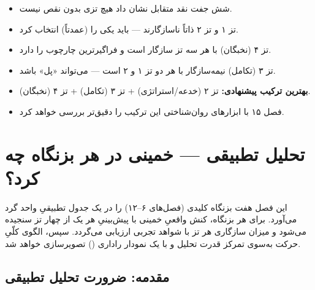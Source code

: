 \documentclass[12pt,a4paper]{book}
\newcommand{\keyword}[1]{\textbf{\textcolor{cPrimary}{#1}}}
\newcommand{\en}[1]{\lr{\textit{#1}}}
\begin{document}
\begin{principleBox}
\begin{itemize}[label=\textcolor{cPrimary}{$\blacksquare$}, rightmargin=2em]
    \item شش جفت نقد متقابل نشان داد هیچ تزی بدون نقص نیست.
    \item تز ۱ و تز ۲ ذاتاً ناسازگارند — باید یکی را (عمدتاً) انتخاب کرد.
    \item تز ۴ (نخبگان) با هر سه تز سازگار است و فراگیرترین چارچوب را دارد.
    \item تز ۳ (تکامل) نیمه‌سازگار با هر دو تز ۱ و ۲ است — می‌تواند «پل» باشد.
    \item \keyword{بهترین ترکیب پیشنهادی:} تز ۲ (خدعه/استراتژی) + تز ۳ (تکامل) + تز ۴ (نخبگان).
    \item فصل ۱۵ با ابزارهای روان‌شناختی این ترکیب را دقیق‌تر بررسی خواهد کرد.
\end{itemize}
\end{principleBox}







\chapter{تحلیل تطبیقی — خمینی در هر بزنگاه چه کرد؟}
\label{ch:comparative}

\begin{infoBox}
این فصل هفت بزنگاه کلیدی (فصل‌های ۶–۱۲) را در یک جدول تطبیقیِ واحد گرد می‌آورد.
برای هر بزنگاه، کنش واقعیِ خمینی با پیش‌بینیِ هر یک از چهار تز سنجیده می‌شود
و میزان سازگاری هر تز با شواهد تجربی ارزیابی می‌گردد.
سپس، الگوی کلّیِ حرکت به‌سوی تمرکز قدرت تحلیل و با یک نمودار راداری
(\en{radar chart}) تصویر‌سازی خواهد شد.
\end{infoBox}

\section{مقدمه: ضرورت تحلیل تطبیقی}
\label{sec:ch13-intro}
\end{document}
